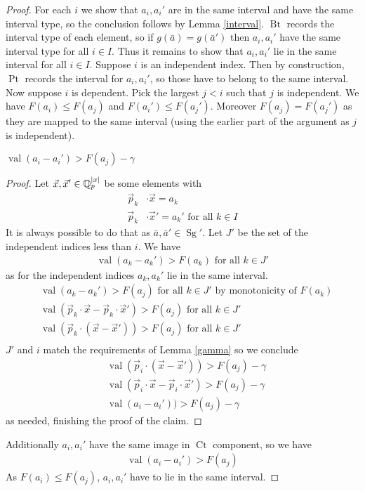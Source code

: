 \documentclass{amsart}
\DeclareMathOperator{\Sg}{Sg}
\DeclareMathOperator{\Bt}{Bt}
\DeclareMathOperator{\Pt}{Pt}
\DeclareMathOperator{\Ct}{Ct}
\DeclareMathOperator{\val}{val}
\begin{document}
\begin{proof}
  For each $i$ we show that $a_i, a_i'$ are in the same interval and have the same interval type, so the conclusion follows by Lemma \ref{interval}.
  $\Bt$ records the interval type of each element, so if $g(\bar a) = g(\bar a')$ then $a_i, a_i'$ have the same interval type for all $i \in I$.
  Thus it remains to show that $a_i, a_i'$ lie in the same interval for all $i \in I$.
  Suppose $i$ is an independent index.
  Then by construction, $\Pt$ records the interval for $a_i, a_i'$, so those have to belong to the same interval.
  Now suppose $i$ is dependent.
  Pick the largest $j < i$ such that $j$ is independent.
  We have $F(a_i) \leq F(a_j)$ and $F(a_i') \leq F(a_j')$.
  Moreover $F(a_j) = F(a_j')$ as they are mapped to the same interval (using the earlier part of the argument as $j$ is independent).
  
  \begin{Claim}
    $\val(a_i - a_i') > F(a_j) - \gamma$
  \end{Claim}
  \begin{proof}
    Let $\vec x, \vec x' \in \mathbb{Q}_p^{|x|}$ be some elements with
    \begin{align*}
      \vec p_k &\cdot \vec x = a_k \\
      \vec p_k &\cdot \vec x' = a_k' \text { for all } k \in I
    \end{align*}
    It is always possible to do that as $\bar a, \bar a' \in \Sg'$. 
    Let $J'$ be the set of the independent indices less than $i$.
    We have 
    \begin{align*}
      \val(a_k - a_k') > F(a_k) \text { for all } k \in J'
    \end{align*}
    as for the independent indices $a_k, a_k'$ lie in the same interval.
    \begin{align*}
      &\val(a_k - a_k') > F(a_j) \text { for all } k \in J' \text{ by monotonicity of $F(a_k)$} \\
      &\val(\vec p_k \cdot \vec x - \vec p_k \cdot \vec x') > F(a_j) \text { for all } k \in J' \\
      &\val(\vec p_k \cdot (\vec x - \vec x')) > F(a_j) \text { for all } k \in J' \\
    \end{align*}
    $J'$ and $i$ match the requirements of Lemma \ref {gamma} so we conclude
    \begin{align*}
      &\val(\vec p_i \cdot (\vec x - \vec x')) > F(a_j) - \gamma \\
      &\val(\vec p_i \cdot \vec x - \vec p_i \cdot \vec x') > F(a_j) - \gamma \\
      &\val(a_i - a_i')) > F(a_j) - \gamma
    \end{align*}
    as needed, finishing the proof of the claim.
  \end{proof}	
  Additionally $a_i, a_i'$ have the same image in $\Ct$ component, so we have
  \begin{align*}
    \val(a_i - a_i') > F(a_j) 
  \end{align*}
  As $F(a_i) \leq F(a_j)$, $a_i, a_i'$ have to lie in the same interval.	
\end{proof}
\end{document}
